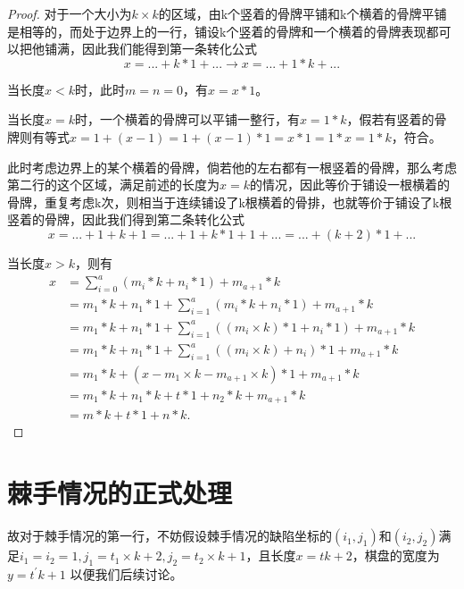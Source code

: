 \begin{proof}

    对于一个大小为$k \times k$的区域，由k个竖着的骨牌平铺和k个横着的骨牌平铺是相等的，而处于边界上的一行，铺设k个竖着的骨牌和一个横着的骨牌表现都可以把他铺满，因此我们能得到第一条转化公式
    \begin{equation}
        x =... + k * 1 + ... \rightarrow x = ... + 1 * k + ...
    \end{equation}

    当长度$x < k$时，此时$m = n = 0$，有$x = x * 1$。

    当长度$x = k$时，一个横着的骨牌可以平铺一整行，有$x = 1 * k$，假若有竖着的骨牌则有等式$x = 1 + (x - 1) = 1 + (x - 1) * 1 = x * 1 = 1 * x = 1 * k$，符合。

    此时考虑边界上的某个横着的骨牌，倘若他的左右都有一根竖着的骨牌，那么考虑第二行的这个区域，满足前述的长度为$x = k$的情况，因此等价于铺设一根横着的骨牌，重复考虑k次，则相当于连续铺设了k根横着的骨排，也就等价于铺设了k根竖着的骨牌，因此我们得到第二条转化公式
    \begin{equation}
        x = ... + 1 + k + 1 = ... + 1 + k * 1 + 1 + ...= ... + (k + 2) * 1 + ...
    \end{equation}

    当长度$x > k$，则有
    $$
        \begin{aligned}
            x & = \sum_{i=0}^{a} (m_i * k + n_i * 1)     + m_{a+1} * k                            \\
              & = m_1 * k + n_1 * 1 + \sum_{i=1}^{a} (m_i * k + n_i * 1)+ m_{a+1} * k             \\
              & = m_1 * k + n_1 * 1 + \sum_{i=1}^{a} ((m_i \times k) * 1 + n_i * 1) + m_{a+1} * k \\
              & = m_1 * k + n_1 * 1 + \sum_{i=1}^{a} ((m_i \times k) + n_i) * 1 + m_{a+1} * k     \\
              & = m_1 * k + (x - m_1 \times k - m_{a+1} \times k) * 1 + m_{a+1} * k               \\
              & = m_1 * k + n_1 * k + t * 1 + n_2 * k + m_{a+1} * k                               \\
              & = m * k + t * 1 + n * k.
        \end{aligned}
    $$
\end{proof}

\section{棘手情况的正式处理}
故对于棘手情况的第一行，不妨假设棘手情况的缺陷坐标的$(i_1, j_1)$和$(i_2, j_2)$满足$i_1 = i_2 = 1, j_1 = t_1 \times k + 2, j_2 = t_2 \times k + 1$，且长度$x = tk + 2$，棋盘的宽度为$y = t^{'}k + 1$ 以便我们后续讨论。


